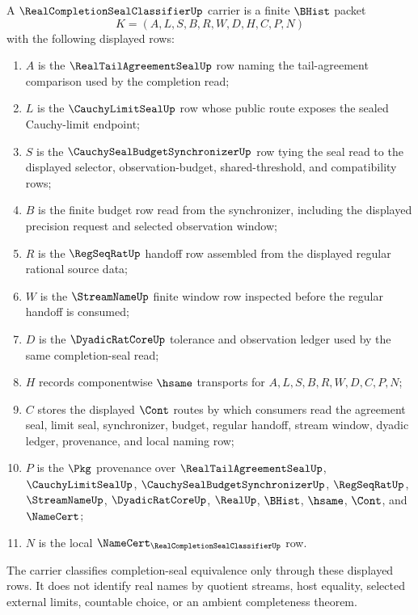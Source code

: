 \begin{definition}
\label{def:real-completion-seal-classifier-carrier}
A $\RealCompletionSealClassifierUp$ carrier is a finite $\BHist$ packet
$$
K=(A,L,S,B,R,W,D,H,C,P,N)
$$
with the following displayed rows:
\begin{enumerate}
\item $A$ is the $\RealTailAgreementSealUp$ row naming the tail-agreement comparison used by the completion read;
\item $L$ is the $\CauchyLimitSealUp$ row whose public route exposes the sealed Cauchy-limit endpoint;
\item $S$ is the $\CauchySealBudgetSynchronizerUp$ row tying the seal read to the displayed selector, observation-budget, shared-threshold, and compatibility rows;
\item $B$ is the finite budget row read from the synchronizer, including the displayed precision request and selected observation window;
\item $R$ is the $\RegSeqRatUp$ handoff row assembled from the displayed regular rational source data;
\item $W$ is the $\StreamNameUp$ finite window row inspected before the regular handoff is consumed;
\item $D$ is the $\DyadicRatCoreUp$ tolerance and observation ledger used by the same completion-seal read;
\item $H$ records componentwise $\hsame$ transports for $A,L,S,B,R,W,D,C,P,N$;
\item $C$ stores the displayed $\Cont$ routes by which consumers read the agreement seal, limit seal, synchronizer, budget, regular handoff, stream window, dyadic ledger, provenance, and local naming row;
\item $P$ is the $\Pkg$ provenance over $\RealTailAgreementSealUp$, $\CauchyLimitSealUp$, $\CauchySealBudgetSynchronizerUp$, $\RegSeqRatUp$, $\StreamNameUp$, $\DyadicRatCoreUp$, $\RealUp$, $\BHist$, $\hsame$, $\Cont$, and $\NameCert$;
\item $N$ is the local $\NameCert_{\RealCompletionSealClassifierUp}$ row.
\end{enumerate}
The carrier classifies completion-seal equivalence only through these displayed rows. It does not identify real names by quotient streams, host equality, selected external limits, countable choice, or an ambient completeness theorem.
\end{definition}

